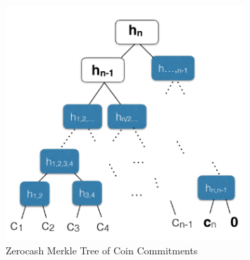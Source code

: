 \begin{figure}
    \centering
    \includegraphics[width=0.8\textwidth]{images/zcash/merkle tree.png}
    \caption{Zerocash Merkle Tree of Coin Commitments}
    \label{fig:zcash-merkle}
\end{figure}

